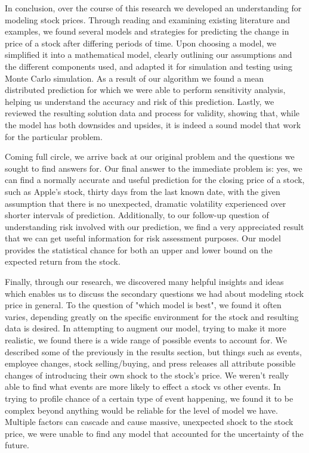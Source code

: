 \documentclass{article}
\begin{document}
In conclusion, over the course of this research we developed an understanding for modeling stock prices. Through reading and examining existing literature and examples, we found several models and strategies for predicting the change in price of a stock after differing periods of time. Upon choosing a model, we simplified it into a mathematical model, clearly outlining our assumptions and the different components used, and adapted it for simulation and testing using Monte Carlo simulation. As a result of our algorithm we found a mean distributed prediction for which we were able to perform sensitivity analysis, helping us understand the accuracy and risk of this prediction. Lastly, we reviewed the resulting solution data and process for validity, showing that, while the model has both downsides and upsides, it is indeed a sound model that work for the particular problem.

Coming full circle, we arrive back at our original problem and the questions we sought to find answers for. Our final answer to the immediate problem is: yes, we can find a normally accurate and useful prediction for the closing price of a stock, such as Apple's stock, thirty days from the last known date, with the given assumption that there is no unexpected, dramatic volatility experienced over shorter intervals of prediction. Additionally, to our follow-up question of understanding risk involved with our prediction, we find a very appreciated result that we can get useful information for risk assessment purposes. Our model provides the statistical chance for both an upper and lower bound on the expected return from the stock.

Finally, through our research, we discovered many helpful insights and ideas which enables us to discuss the secondary questions we had about modeling stock price in general. To the question of "which model is best", we found it often varies, depending greatly on the specific environment for the stock and resulting data is desired. In attempting to augment our model, trying to make it more realistic, we found there is a wide range of possible events to account for. We described some of the previously in the results section, but things such as events, employee changes, stock selling/buying, and press releases all attribute possible changes of introducing their own shock to the stock's price. We weren't really able to find what events are more likely to effect a stock vs other events. In trying to profile chance of a certain type of event happening, we found it to be complex beyond anything would be reliable for the level of model we have. Multiple factors can cascade and cause massive, unexpected shock to the stock price, we were unable to find any model that accounted for the uncertainty of the future.
\end{document}
